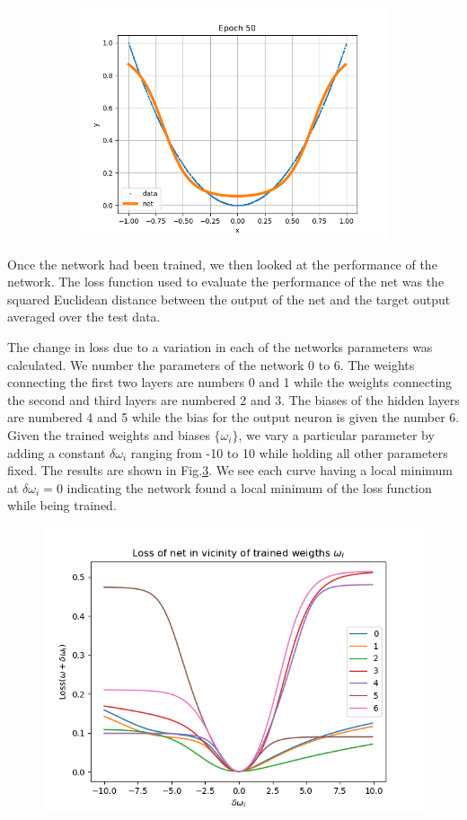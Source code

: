 \documentclass[12pt,a4paper]{article}
\begin{document}
\begin{figure}
\begin{subfigure}{.32\textwidth}
\includegraphics[scale=0.3]{Images/ALearningNet50.png}
\caption{}
\label{training3}
\end{subfigure}
\caption{}
\label{training}
\end{figure}

Once the network had been trained, we then looked at the performance of the network. The loss function used to evaluate the performance of the net was the squared Euclidean distance between the output of the net and the target output averaged over the test data.

The change in loss due to a variation in each of the networks parameters was calculated. We number the parameters of the network 0 to 6. The weights connecting the first two layers are numbers 0 and 1 while the weights connecting the second and third layers are numbered 2 and 3. The biases of the hidden layers are numbered 4 and 5 while the bias for the output neuron is given the number 6. Given the trained weights and biases $\{\omega_i\}$, we vary a particular parameter by adding a constant $\delta \omega_i$ ranging from -10 to 10 while holding all other parameters fixed. The results are shown in Fig.\ref{LossNearTrainedWeights}. We see each curve having a local minimum at $\delta\omega_i = 0$ indicating the network found a local minimum of the loss function while being trained.

\begin{figure}[H]
\center
\includegraphics[scale=0.5]{Images/LossInVicinityOfTrainedWeights.png}
\caption{}
\label{LossNearTrainedWeights}
\end{figure}
\end{document}
